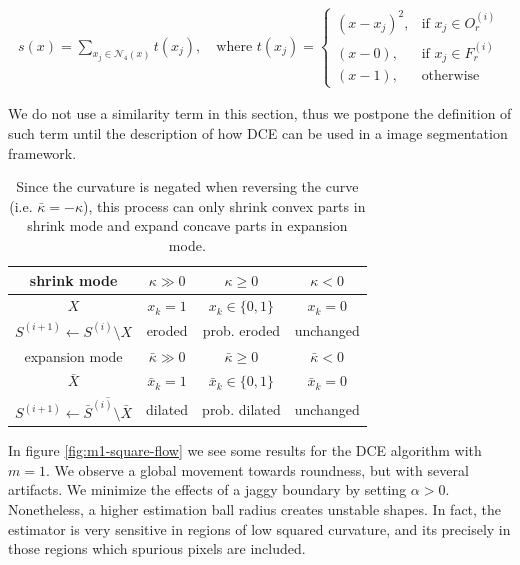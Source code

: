 \documentclass[runningheads]{llncs}
\begin{document}
	\begin{align}
		s(x)=\sum_{x_j \in \mathcal{N}_4(x)}{ t(x_j) }, \quad \text{where } t(x_j) = \left\{\begin{array}{ll}
		(x-x_j)^2, & \text{if } x_j \in O_{r}^{(i)}\\
		(x-0), & \text{if } x_j \in F_{r}^{(i)}\\
		(x-1), & \text{otherwise }
		\end{array}\right.
		\label{eq:length-penalization}
	\end{align}
	
	We do not use a similarity term in this section, thus we postpone the definition of such term until the description of how DCE can be used in a image segmentation framework.



\begin{table}
  \center
  \begin{tabular}{|c|c|c|c|} \hline
    shrink mode &    $\kappa \gg 0$ & $\kappa \geq 0$ &  $\kappa < 0$ \\ \hline
    $X$ & $x_k=1$ & $x_k \in \{0,1\}$ & $x_k=0$ \\ \hline
    $S^{(i+1)} \leftarrow S^{(i)} \setminus X$ & eroded & prob. eroded & unchanged  \\ \hline \hline
    expansion mode &    $\bar{\kappa} \gg 0$ & $\bar{\kappa} \geq 0$ & $\bar{\kappa} < 0$ \\ \hline
    $\bar{X}$ & $\bar{x}_k=1$ & $\bar{x}_k \in \{0,1\}$ & $\bar{x}_k=0$ \\ \hline
    $S^{(i+1)} \leftarrow \overline{\bar{S}^{(i)} \setminus \bar{X}}$ & dilated & prob. dilated & unchanged \\ \hline 
  \end{tabular}
  
  \label{tab:flow-summary}	  
  \caption{  Since the curvature is negated when reversing the curve (i.e. $\bar{\kappa}=-\kappa$), this process can only shrink  convex parts in shrink mode and expand concave parts in expansion mode.}

\end{table}


In figure \ref{fig:m1-square-flow} we see some results for the DCE algorithm  with $m=1$. We observe a global movement towards roundness, but with several artifacts. We minimize the effects of a jaggy boundary by setting $\alpha > 0$. Nonetheless, a higher estimation ball radius creates unstable shapes. In fact, the estimator is very sensitive in regions of low squared curvature, and its precisely in those regions which spurious pixels are included.
\end{document}
